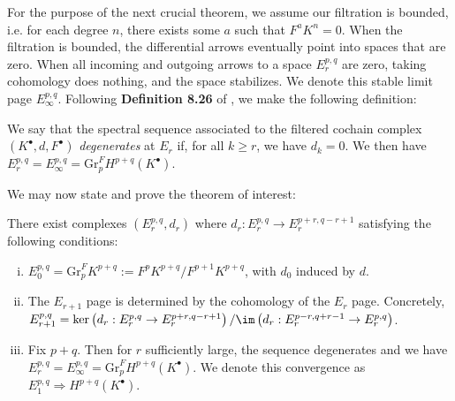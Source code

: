 \medskip

\noindent For the purpose of the next crucial theorem, we assume our filtration is bounded, i.e. for each degree $n$, there exists some $a$ such that $F^a K^n=0$. When the filtration is bounded, the differential arrows eventually point into spaces that are zero. When all incoming and outgoing arrows to a space $E_r^{p,q}$ are zero, taking cohomology does nothing, and the space stabilizes. We denote this stable limit page $E_\infty^{p,q}$. Following \textbf{Definition 8.26} of \cite{VoisinI2002}, we make the following definition:

\begin{definition}
    We say that the spectral sequence associated to the filtered cochain complex $\left(K^\bullet, d, F^\bullet\right)$ \emph{degenerates} at $E_r$ if, for all $k\geq r$, we have $d_k=0$. We then have $E_r^{p,q} = E_\infty^{p,q} = \mathrm{Gr}_p^F H^{p+q}\left(K^\bullet\right)$.
\end{definition}

\noindent We may now state and prove the theorem of interest:

\begin{theorem}
    There exist complexes $\left(E_r^{p,q}, d_r\right)$ where $d_r:E_r^{p,q} \to E_r^{p+r,q-r+1}$ satisfying the following conditions:
    \begin{enumerate}[i.]
        \item $E_0^{p,q}=\mathrm{Gr}_p^F K^{p+q}:= F^pK^{p+q}/F^{p+1}K^{p+q}$, with $d_0$ induced by $d$.
        \item The $E_{r+1}$ page is determined by the cohomology of the $E_r$ page. Concretely, $E_{r+1}^{p,q} = \ker\left(d_r:E_r^{p,q}\to E_r^{p+r,q-r+1}\right)/\im \left(d_r:E_r^{p-r, q+r-1}\to E_r^{p,q}\right)$. 
        \item Fix $p+q$. Then for $r$ sufficiently large, the sequence degenerates and we have $E_r^{p,q} = E_\infty^{p,q} = \mathrm{Gr}_p^F H^{p+q}\left(K^\bullet\right)$. We denote this convergence as $E_1^{p,q} \Rightarrow H^{p+q}\left(K^\bullet\right)$.
    \end{enumerate}
\end{theorem}

